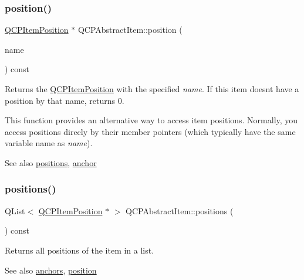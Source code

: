 \subsubsection{\texorpdfstring{position()}{position()}}
{\footnotesize\ttfamily \hyperlink{class_q_c_p_item_position}{Q\+C\+P\+Item\+Position} $\ast$ Q\+C\+P\+Abstract\+Item\+::position (\begin{DoxyParamCaption}\item[{const Q\+String \&}]{name }\end{DoxyParamCaption}) const}

Returns the \hyperlink{class_q_c_p_item_position}{Q\+C\+P\+Item\+Position} with the specified {\itshape name}. If this item doesn\textquotesingle{}t have a position by that name, returns 0.

This function provides an alternative way to access item positions. Normally, you access positions direcly by their member pointers (which typically have the same variable name as {\itshape name}).

\begin{DoxySeeAlso}{See also}
\hyperlink{class_q_c_p_abstract_item_a709f655ac3f7f22d452714134662b454}{positions}, \hyperlink{class_q_c_p_abstract_item_a139c255ea8831642fac91748e29a5adb}{anchor} 
\end{DoxySeeAlso}
\mbox{\label{class_q_c_p_abstract_item_a709f655ac3f7f22d452714134662b454}} 
\subsubsection{\texorpdfstring{positions()}{positions()}}
{\footnotesize\ttfamily Q\+List$<$ \hyperlink{class_q_c_p_item_position}{Q\+C\+P\+Item\+Position} $\ast$ $>$ Q\+C\+P\+Abstract\+Item\+::positions (\begin{DoxyParamCaption}{ }\end{DoxyParamCaption}) const\hspace{0.3cm}{\ttfamily [inline]}}

Returns all positions of the item in a list.

\begin{DoxySeeAlso}{See also}
\hyperlink{class_q_c_p_abstract_item_a81d1ecfea3368b836cf9675a0045e659}{anchors}, \hyperlink{class_q_c_p_abstract_item_a2589c3d298f9a576d77d9addb440a18d}{position} 
\end{DoxySeeAlso}
\mbox{\label{class_q_c_p_abstract_item_aa5cffb034fc65dbb91c77e02c1c14251}} 

